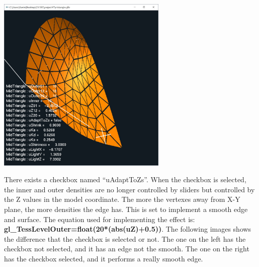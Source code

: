 \documentclass[letterpaper,14pt,titlepage,fleqn]{article}
\begin{document}
\begin{center}
	\includegraphics[width=3.2in]{changeZ.jpg}
\end{center}
There exists a checkbox named ``uAdaptToZs''. When the checkbox is selected, the inner and outer densities are no longer controlled by sliders but controlled by the Z values in the model coordinate. The more the vertexes away from X-Y plane, the more densities the edge has. This is set to implement a smooth edge and surface. The equation used for implementing the effect is: \textbf{gl\_TessLevelOuter=float(20*(abs(uZ)+0.5))}. The following images shows the difference that the checkbox is selected or not. The one on the left has the checkbox not selected, and it has an edge not the smooth. The one on the right has the checkbox selected, and it performs a really smooth edge.
\end{document}
